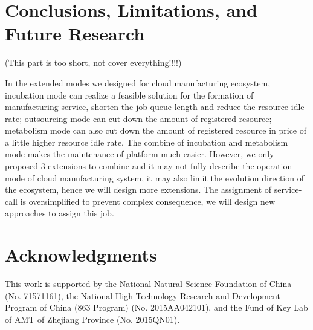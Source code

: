 \section{Conclusions, Limitations, and Future Research} %
\label{sec:contributions_limitations_and_future_research}
(This part is too short, not cover everything!!!!)

In the extended modes we designed for cloud manufacturing ecosystem, incubation mode can realize a feasible solution for the formation of manufacturing service, shorten the job queue length and reduce the resource idle rate; outsourcing mode can cut down the amount of registered resource; metabolism mode can also cut down the amount of registered resource in price of a little higher resource idle rate. The combine of incubation and metabolism mode makes the maintenance of platform much easier.
However, we only proposed 3 extensions to combine and it may not fully describe the operation mode of cloud manufacturing system, it may also limit the evolution direction of the ecosystem, hence we will design more extensions. The assignment of service-call is oversimplified to prevent complex consequence, we will design new approaches to assign this job.

\section{Acknowledgments} %
\label{sec:acknowledgments}
This work is supported by the National Natural Science Foundation of China (No. 71571161), the National High Technology Research and Development Program of China (863 Program) (No. 2015AA042101), and the Fund of Key Lab of AMT of Zhejiang Province (No. 2015QN01). 
